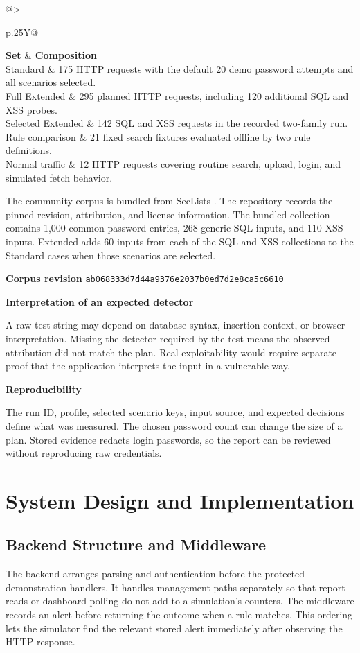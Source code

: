 \documentclass[11pt,letterpaper,oneside]{report}
\makeatletter
\newcommand{\topic}[1]{\smallskip\noindent\textbf{#1}\par\nobreak\vspace{-.39em}}
\newcommand{\tabletitle}[1]{\captionof{table}{#1}\smallskip}
\newcommand{\bodytable}[1]{\begin{tabularx}{\linewidth}{@{}>{\raggedright\arraybackslash}p{.25\linewidth}Y@{}}\toprule #1\bottomrule\end{tabularx}}
\makeatother
\begin{document}
\tabletitle{Test sets and their composition}
\bodytable{\textbf{Set} & \textbf{Composition}\\\midrule
Standard & 175 HTTP requests with the default 20 demo password attempts and all scenarios selected.\\
Full Extended & 295 planned HTTP requests, including 120 additional SQL and XSS probes.\\
Selected Extended & 142 SQL and XSS requests in the recorded two-family run.\\
Rule comparison & 21 fixed search fixtures evaluated offline by two rule definitions.\\
Normal traffic & 12 HTTP requests covering routine search, upload, login, and simulated fetch behavior.\\}

The community corpus is bundled from SecLists \cite{seclists}. The repository records the pinned revision, attribution, and license information. The bundled collection contains 1,000 common password entries, 268 generic SQL inputs, and 110 XSS inputs. Extended adds 60 inputs from each of the SQL and XSS collections to the Standard cases when those scenarios are selected.

\textbf{Corpus revision} \texttt{ab068333d7d44a9376e2037b0ed7d2e8ca5c6610}

\topic{Interpretation of an expected detector}
A raw test string may depend on database syntax, insertion context, or browser interpretation. Missing the detector required by the test means the observed attribution did not match the plan. Real exploitability would require separate proof that the application interprets the input in a vulnerable way.

\topic{Reproducibility}
The run ID, profile, selected scenario keys, input source, and expected decisions define what was measured. The chosen password count can change the size of a plan. Stored evidence redacts login passwords, so the report can be reviewed without reproducing raw credentials.

\chapter{System Design and Implementation}
\section{Backend Structure and Middleware}
The backend arranges parsing and authentication before the protected demonstration handlers. It handles management paths separately so that report reads or dashboard polling do not add to a simulation's counters. The middleware records an alert before returning the outcome when a rule matches. This ordering lets the simulator find the relevant stored alert immediately after observing the HTTP response.
\end{document}
